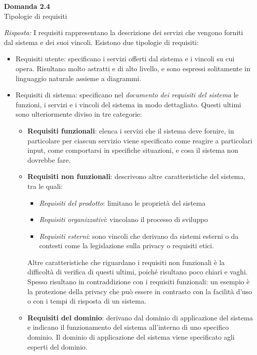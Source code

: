 \documentclass{article}
\newenvironment{problem}[2][Domanda]
    { \begin{mdframed}[backgroundcolor=gray!20] \textbf{#1 #2} \\}
    {  \end{mdframed}}
\newenvironment{solution}
    {\textit{Risposta:}}
    {}
\begin{document}
\begin{problem}{2.4}
Tipologie di requisiti
\end{problem}
\begin{solution}
I requisiti rappresentano la descrizione dei servizi che vengono forniti dal sistema e dei suoi vincoli.
\newline
Esistono due tipologie di requisiti:
\begin{itemize}
	\item Requisiti utente: specificano i servizi offerti dal sistema e i vincoli su cui opera. Risultano molto astratti e di alto livello, e sono espressi solitamente in linguaggio naturale assieme a diagrammi.
	\item Requisiti di sistema: specificano nel \textit{documento dei requisiti del sistema} le funzioni, i servizi e i vincoli del sistema in modo dettagliato.
	\newline
	Questi ultimi sono ulteriormente diviso in tre categorie:
	\begin{itemize}
		\item \textbf{Requisiti funzionali}: elenca i servizi che il sistema deve fornire, in particolare per ciascun servizio viene specificato come reagire a particolari input, come comportarsi in specifiche situazioni, e cosa il sistema non dovrebbe fare.
		\item \textbf{Requisiti non funzionali}: descrivono altre caratteristiche del sistema, tra le quali:
		\begin{itemize}
			\item \textit{Requisiti del prodotto}: limitano le proprietà del sistema
			\item \textit{Requisiti organizzativi}: vincolano il processo di sviluppo
			\item \textit{Requisiti esterni}: sono vincoli che derivano da sistemi esterni o da contesti come la legislazione sulla privacy o requisiti etici.
		\end{itemize}
		Altre caratteristiche che riguardano i requisiti non funzionali è la difficoltà di verifica di questi ultimi, poiché risultano poco chiari e vaghi.
		Spesso risultano in contraddizione con i requisiti funzionali: un esempio è la protezione della privacy che può essere in contrasto con la facilità d'uso o con i tempi di risposta di un sistema.
		\item \textbf{Requisiti del dominio}: derivano dal dominio di applicazione del sistema e indicano il funzionamento del sistema all'interno di uno specifico dominio.
		\newline
		Il dominio di applicazione del sistema viene specificato agli esperti del dominio.
	\end{itemize}
\end{itemize}
\end{solution}
\end{document}
